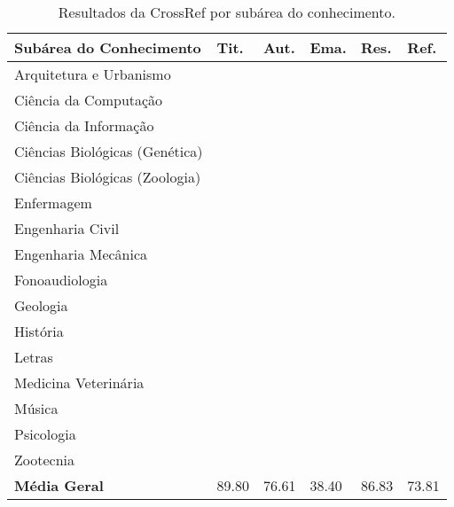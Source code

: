 \begin{table}
    \caption{Resultados da CrossRef por subárea do conhecimento.}
    \begin{center}
        \begin{tabular}{|p{6cm}|C{1.2cm}|C{1.2cm}|C{1.2cm}|C{1.2cm}|C{1.2cm}|}
            \hline 
            \textbf{Subárea do Conhecimento} & \textbf{Tit.} & \textbf{Aut.} & \textbf{Ema.} & \textbf{Res.} & \textbf{Ref.} \\ \hline 
            Arquitetura e Urbanismo &  &  &  &  &  \\ \hline
            Ciência da Computação &  &  &  &  &  \\ \hline
            Ciência da Informação &  &  &  &  &  \\ \hline
            Ciências Biológicas (Genética) &  &  &  &  &  \\ \hline
            Ciências Biológicas (Zoologia) &  &  &  &  &  \\ \hline
            Enfermagem &  &  &  &  &  \\ \hline
            Engenharia Civil &  &  &  &  &  \\ \hline
            Engenharia Mecânica &  &  &  &  &  \\ \hline
            Fonoaudiologia &  &  &  &  &  \\ \hline
            Geologia &  &  &  &  &  \\ \hline
            História &  &  &  &  &  \\ \hline
            Letras &  &  &  &  &  \\ \hline
            Medicina Veterinária &  &  &  &  &  \\ \hline
            Música &  &  &  &  &  \\ \hline
            Psicologia &  &  &  &  &  \\ \hline
            Zootecnia &  &  &  &  &  \\ \hline
            \textbf{Média Geral} & 89.80 & 76.61 & 38.40 & 86.83 & 73.81 \\ \hline
        \end{tabular}
    \end{center}
    \label{tab:results-crossref}
\end{table}

